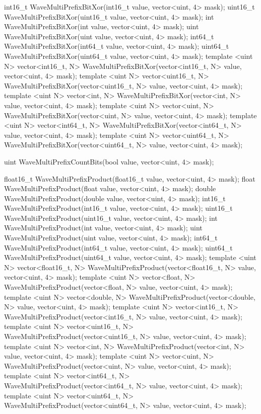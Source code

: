 \begin{HLSL}
int16_t WaveMultiPrefixBitXor(int16_t value, vector<uint, 4> mask);
uint16_t WaveMultiPrefixBitXor(uint16_t value, vector<uint, 4> mask);
int WaveMultiPrefixBitXor(int value, vector<uint, 4> mask);
uint WaveMultiPrefixBitXor(uint value, vector<uint, 4> mask);
int64_t WaveMultiPrefixBitXor(int64_t value, vector<uint, 4> mask);
uint64_t WaveMultiPrefixBitXor(uint64_t value, vector<uint, 4> mask);
template <uint N>
vector<int16_t, N> WaveMultiPrefixBitXor(vector<int16_t, N> value, vector<uint, 4> mask);
template <uint N>
vector<uint16_t, N> WaveMultiPrefixBitXor(vector<uint16_t, N> value, vector<uint, 4> mask);
template <uint N>
vector<int, N> WaveMultiPrefixBitXor(vector<int, N> value, vector<uint, 4> mask);
template <uint N>
vector<uint, N> WaveMultiPrefixBitXor(vector<uint, N> value, vector<uint, 4> mask);
template <uint N>
vector<int64_t, N> WaveMultiPrefixBitXor(vector<int64_t, N> value, vector<uint, 4> mask);
template <uint N>
vector<uint64_t, N> WaveMultiPrefixBitXor(vector<uint64_t, N> value, vector<uint, 4> mask);

uint WaveMultiPrefixCountBits(bool value, vector<uint, 4> mask);

float16_t WaveMultiPrefixProduct(float16_t value, vector<uint, 4> mask);
float WaveMultiPrefixProduct(float value, vector<uint, 4> mask);
double WaveMultiPrefixProduct(double value, vector<uint, 4> mask);
int16_t WaveMultiPrefixProduct(int16_t value, vector<uint, 4> mask);
uint16_t WaveMultiPrefixProduct(uint16_t value, vector<uint, 4> mask);
int WaveMultiPrefixProduct(int value, vector<uint, 4> mask);
uint WaveMultiPrefixProduct(uint value, vector<uint, 4> mask);
int64_t WaveMultiPrefixProduct(int64_t value, vector<uint, 4> mask);
uint64_t WaveMultiPrefixProduct(uint64_t value, vector<uint, 4> mask);
template <uint N>
vector<float16_t, N> WaveMultiPrefixProduct(vector<float16_t, N> value, vector<uint, 4> mask);
template <uint N>
vector<float, N> WaveMultiPrefixProduct(vector<float, N> value, vector<uint, 4> mask);
template <uint N>
vector<double, N> WaveMultiPrefixProduct(vector<double, N> value, vector<uint, 4> mask);
template <uint N>
vector<int16_t, N> WaveMultiPrefixProduct(vector<int16_t, N> value, vector<uint, 4> mask);
template <uint N>
vector<uint16_t, N> WaveMultiPrefixProduct(vector<uint16_t, N> value, vector<uint, 4> mask);
template <uint N>
vector<int, N> WaveMultiPrefixProduct(vector<int, N> value, vector<uint, 4> mask);
template <uint N>
vector<uint, N> WaveMultiPrefixProduct(vector<uint, N> value, vector<uint, 4> mask);
template <uint N>
vector<int64_t, N> WaveMultiPrefixProduct(vector<int64_t, N> value, vector<uint, 4> mask);
template <uint N>
vector<uint64_t, N> WaveMultiPrefixProduct(vector<uint64_t, N> value, vector<uint, 4> mask);


\end{HLSL}
